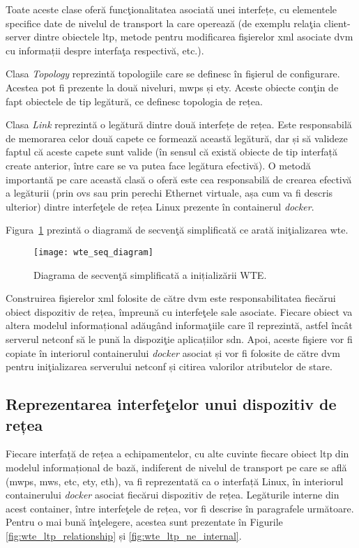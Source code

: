 Toate aceste clase oferă funcţionalitatea asociată unei interfețe, cu elementele specifice date de nivelul de transport la care operează (de exemplu relaţia client-server dintre obiectele \gls{ltp}, metode pentru modificarea fişierelor \gls{xml} asociate \gls{dvm} cu informații despre interfaţa respectivă, etc.).

Clasa \textit{Topology} reprezintă topologiile care se definesc în fişierul de configurare. Acestea pot fi prezente la două niveluri, \gls{mwps} și \gls{ety}. Aceste obiecte conţin de fapt obiectele de tip legătură, ce definesc topologia de rețea.

Clasa \textit{Link} reprezintă o legătură dintre două interfețe de rețea. Este responsabilă de memorarea celor două capete ce formează această legătură, dar și să valideze faptul că aceste capete sunt valide (în sensul că există obiecte de tip interfață create anterior, între care se va putea face legătura efectivă). O metodă importantă pe care această clasă o oferă este cea responsabilă de crearea efectivă a legăturii (prin \gls{ovs} sau prin perechi Ethernet virtuale, așa cum va fi descris ulterior) dintre interfeţele de rețea Linux prezente în containerul \textit{docker}.

Figura~\ref{fig:wte_seq_diagram} prezintă o diagramă de secvenţă simplificată ce arată iniţializarea \gls{wte}.

\begin{figure}[h]
	\centering
	\texttt{[image: wte\_seq\_diagram]}
	\caption{Diagrama de secvenţă simplificată a inițializării WTE.}
	\label{fig:wte_seq_diagram}
\end{figure}

Construirea fişierelor \gls{xml} folosite de către \gls{dvm} este responsabilitatea fiecărui obiect dispozitiv de rețea, împreună cu interfeţele sale asociate. Fiecare obiect va altera modelul informațional adăugând informaţiile care îl reprezintă, astfel încât serverul \gls{netconf} să le pună la dispoziţie aplicațiilor \gls{sdn}. Apoi, aceste fişiere vor fi copiate în interiorul containerului \textit{docker} asociat și vor fi folosite de către \gls{dvm} pentru iniţializarea serverului \gls{netconf} și citirea valorilor atributelor de stare.

\subsection{Reprezentarea interfeţelor unui dispozitiv de rețea}

Fiecare interfață de rețea a echipamentelor, cu alte cuvinte fiecare obiect \gls{ltp} din modelul informațional de bază, indiferent de nivelul de transport pe care se află (\gls{mwps}, \gls{mws}, \gls{etc}, \gls{ety}, \gls{eth}), va fi reprezentată ca o interfață Linux, în interiorul containerului \textit{docker} asociat fiecărui dispozitiv de rețea. Legăturile interne din acest container, între interfeţele de rețea, vor fi descrise în paragrafele următoare. Pentru o mai bună înţelegere, acestea sunt prezentate în Figurile \ref{fig:wte_ltp_relationship} și \ref{fig:wte_ltp_ne_internal}.

